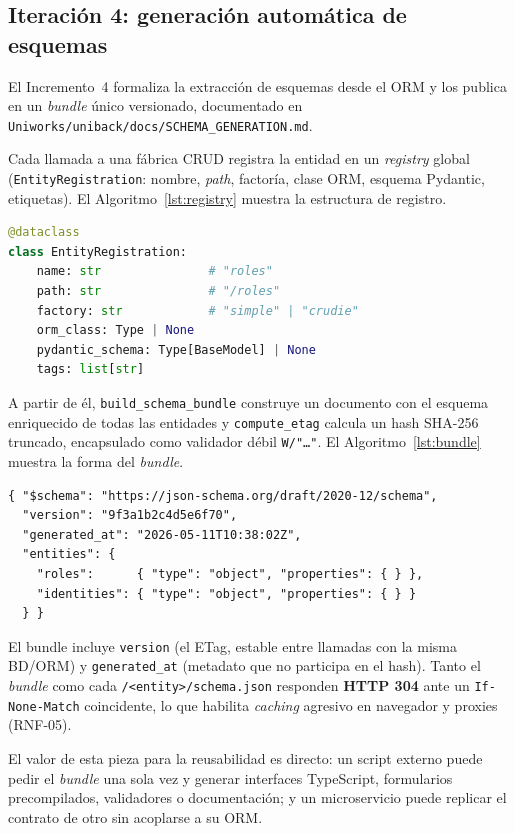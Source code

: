 \subsection{Iteración 4: generación automática de esquemas}
El Incremento~4 formaliza la extracción de esquemas desde el ORM y los publica
en un \emph{bundle} único versionado, documentado en
\texttt{Uniworks/\allowbreak uniback/\allowbreak docs/\allowbreak SCHEMA\_\allowbreak GENERATION.\allowbreak md}.

Cada llamada a una fábrica CRUD registra la entidad en un \emph{registry}
global (\texttt{Entity\allowbreak Registration}: nombre, \emph{path}, factoría, clase ORM,
esquema Pydantic, etiquetas). El Algoritmo~\ref{lst:registry} muestra la estructura de registro.

\begin{lstlisting}[language=Python, caption={Registro de entidad (\texttt{schema\_registry.py})}, label={lst:registry}]
@dataclass
class EntityRegistration:
    name: str               # "roles"
    path: str               # "/roles"
    factory: str            # "simple" | "crudie"
    orm_class: Type | None
    pydantic_schema: Type[BaseModel] | None
    tags: list[str]
\end{lstlisting}

A partir de él, \texttt{build\_schema\_bundle}
construye un documento con el esquema enriquecido de todas las entidades y
\texttt{compute\_etag} calcula un hash SHA-256 truncado, encapsulado como
validador débil \texttt{W/"\ldots"}. El Algoritmo~\ref{lst:bundle} muestra la
forma del \emph{bundle}.

\begin{lstlisting}[style=docker, caption={Documento del bundle de esquemas}, label={lst:bundle}]
{ "$schema": "https://json-schema.org/draft/2020-12/schema",
  "version": "9f3a1b2c4d5e6f70",
  "generated_at": "2026-05-11T10:38:02Z",
  "entities": {
    "roles":      { "type": "object", "properties": { } },
    "identities": { "type": "object", "properties": { } }
  } }
\end{lstlisting} El bundle incluye \texttt{version} (el
ETag, estable entre llamadas con la misma BD/ORM) y \texttt{generated\_at}
(metadato que no participa en el hash). Tanto el \emph{bundle} como cada
\texttt{/\allowbreak <entity>\allowbreak /\allowbreak schema.\allowbreak json} responden \textbf{HTTP 304} ante un
\texttt{If-None-Match} coincidente, lo que habilita \emph{caching} agresivo en
navegador y proxies (RNF-05).

El valor de esta pieza para la reusabilidad es directo: un script externo
puede pedir el \emph{bundle} una sola vez y generar interfaces TypeScript,
formularios precompilados, validadores o documentación; y un microservicio
puede replicar el contrato de otro sin acoplarse a su ORM.

